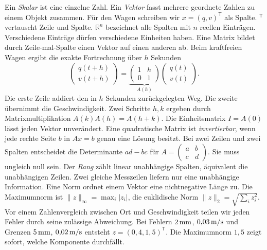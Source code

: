 Ein \emph{Skalar} ist eine einzelne Zahl. Ein \emph{Vektor} fasst mehrere geordnete Zahlen zu einem Objekt zusammen. Für den Wagen schreiben wir \(x=(q,v)^\mathsf T\) als Spalte. \({}^\mathsf T\) vertauscht Zeile und Spalte. \(\mathbb R^n\) bezeichnet alle Spalten mit \(n\) reellen Einträgen. Verschiedene Einträge dürfen verschiedene Einheiten haben.
Eine Matrix bildet durch Zeile-mal-Spalte einen Vektor auf einen anderen ab. Beim kraftfreien Wagen ergibt die exakte Fortrechnung über \(h\) Sekunden
\[
 \begin{pmatrix}q(t+h)\\v(t+h)\end{pmatrix}
 =\underbrace{\begin{pmatrix}1&h\\0&1\end{pmatrix}}_{A(h)}
 \begin{pmatrix}q(t)\\v(t)\end{pmatrix}.
\]
Die erste Zeile addiert den in \(h\) Sekunden zurückgelegten Weg. Die zweite übernimmt die Geschwindigkeit. Zwei Schritte \(h,k\) ergeben durch Matrixmultiplikation \(A(k)A(h)=A(h+k)\). Die Einheitsmatrix \(I=A(0)\) lässt jeden Vektor unverändert.
Eine quadratische Matrix ist \emph{invertierbar}, wenn jede rechte Seite \(b\) in \(Ax=b\) genau eine Lösung besitzt. Bei zwei Zeilen und zwei Spalten entscheidet die Determinante \(ad-bc\) für \(A=\left(\begin{smallmatrix}a&b\\c&d\end{smallmatrix}\right)\). Sie muss ungleich null sein. Der \emph{Rang} zählt linear unabhängige Spalten, äquivalent die unabhängigen Zeilen. Zwei gleiche Messzeilen liefern nur eine unabhängige Information.
Eine Norm ordnet einem Vektor eine nichtnegative Länge zu. Die Maximumnorm ist \(\|z\|_\infty=\max_i |z_i|\), die euklidische Norm \(\|z\|_2=\sqrt{\sum_i z_i^2}\). Vor einem Zahlenvergleich zwischen Ort und Geschwindigkeit teilen wir jeden Fehler durch seine zulässige Abweichung. Bei Fehlern \(2\,\mathrm{mm}\), \(0{,}03\,\mathrm{m/s}\) und Grenzen \(5\,\mathrm{mm}\), \(0{,}02\,\mathrm{m/s}\) entsteht \(z=(0{,}4,1{,}5)^\mathsf T\). Die Maximumnorm \(1{,}5\) zeigt sofort, welche Komponente durchfällt.


